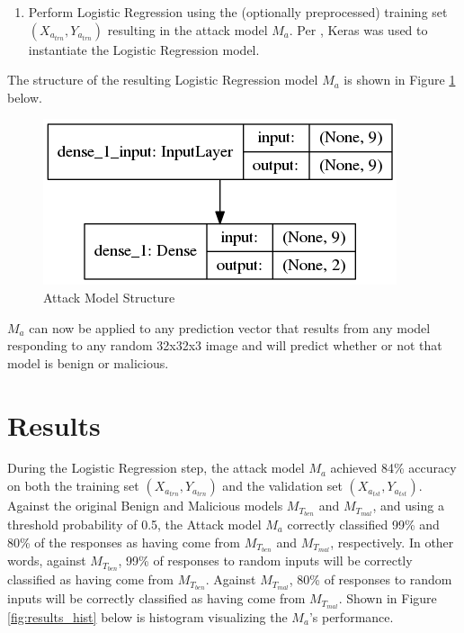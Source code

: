 \begin{enumerate}
    \item Perform Logistic Regression using the (optionally preprocessed) training set $(X_{a_{trn}},Y_{a_{trn}})$ resulting in the attack model $M_a$.  Per \cite{Simple-LR-Keras}, Keras was used to instantiate the Logistic Regression model.
\end{enumerate}

The structure of the resulting Logistic Regression model $M_a$ is shown in Figure \ref{fig:LR-model} below.

\begin{figure}[H]
    \centering
    \includegraphics[scale=0.4]{graphics/atkmodel.png}
    \caption{Attack Model Structure}
    \label{fig:LR-model}
\end{figure}

$M_a$ can now be applied to any prediction vector that results from any model responding to any random 32x32x3 image and will predict whether or not that model is benign or malicious.

\section{Results}

During the Logistic Regression step, the attack model $M_a$ achieved 84\% accuracy on both the training set $(X_{a_{trn}},Y_{a_{trn}})$ and the validation set $(X_{a_{tst}},Y_{a_{tst}})$.  Against the original Benign and Malicious models $M_{T_{ben}}$ and $M_{T_{mal}}$, and using a threshold probability of 0.5, the Attack model $M_a$ correctly classified 99\% and 80\% of the responses as having come from $M_{T_{ben}}$ and $M_{T_{mal}}$, respectively.  In other words, against $M_{T_{ben}}$, 99\% of responses to random inputs will be correctly classified as having come from $M_{T_{ben}}$.  Against $M_{T_{mal}}$, 80\% of responses to random inputs will be correctly classified as having come from $M_{T_{mal}}$.  Shown in Figure \ref{fig:results_hist} below is histogram visualizing the $M_a$'s performance.

